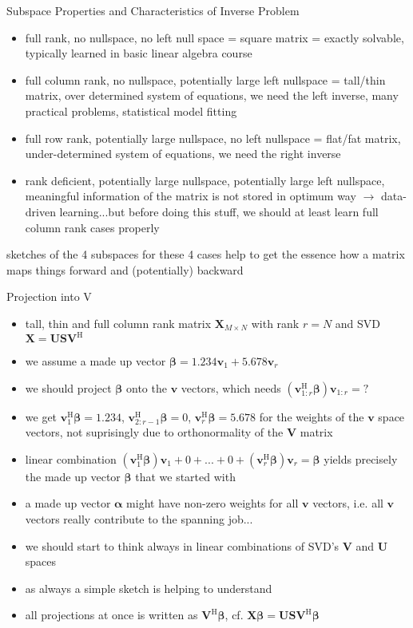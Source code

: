\documentclass[mathserif, aspectratio=43]{intbeamer}
\begin{document}
\begin{frame}{Subspace Properties and Characteristics of Inverse Problem}

\begin{itemize}
\item full rank, no nullspace, no left null space = square matrix = exactly solvable, typically learned in basic linear algebra course
\item full column rank, no nullspace, potentially large left nullspace = tall/thin matrix, over determined system of equations, we need the left inverse, many practical problems, statistical model fitting
\item full row rank, potentially large nullspace, no left nullspace = flat/fat matrix, under-determined system of equations, we need the right inverse
\item rank deficient, potentially large nullspace, potentially large left nullspace, meaningful information of the matrix is not stored in optimum way $\rightarrow$ data-driven learning...but before doing this stuff, we should at least learn full column rank cases properly
\end{itemize}
sketches of the 4 subspaces for these 4 cases help to get the essence how a matrix maps things forward and (potentially) backward
\end{frame}


\begin{frame}{Projection into V}
\begin{itemize}
\item
tall, thin and full column rank matrix $\bm{X}_{M \times N}$ with rank $r=N$ and SVD $\bm{X} = \bm{U} \bm{S} \bm{V}^\mathrm{H}$
\item
we assume a made up vector $\bm{\beta} = 1.234 \bm{v}_1 + 5.678 \bm{v}_r$
\item
we should project $\bm{\beta}$ onto the $\bm{v}$ vectors, which needs $(\bm{v}_{1:r}^\mathrm{H} \bm{\beta}) \bm{v}_{1:r} = ?$
\item
we get $\bm{v}_{1}^\mathrm{H} \bm{\beta} = 1.234$, $\bm{v}_{2:r-1}^\mathrm{H} \bm{\beta} = 0$, $\bm{v}_{r}^\mathrm{H} \bm{\beta} = 5.678$ for the weights of the $\bm{v}$
space vectors, not suprisingly due to orthonormality of the $\bm{V}$ matrix
\item
linear combination $(\bm{v}_{1}^\mathrm{H} \bm{\beta})\bm{v}_1 + 0 + ... + 0 + (\bm{v}_{r}^\mathrm{H} \bm{\beta})\bm{v}_r = \bm{\beta}$ yields precisely the made up vector $\bm{\beta}$ that we started with
\item
a made up vector $\bm{\alpha}$ might have non-zero weights for all $\bm{v}$ vectors, i.e. all $\bm{v}$ vectors really contribute to the spanning job...
\item
we should start to think always in linear combinations of SVD's $\bm{V}$ and $\bm{U}$ spaces
\item
as always a simple sketch is helping to understand
\item
all projections at once is written as $\bm{V}^\mathrm{H} \bm{\beta}$, cf. $\bm{X}\bm{\beta} = \bm{U} \bm{S} \bm{V}^\mathrm{H}\bm{\beta}$
\end{itemize}
\end{frame}
\end{document}
